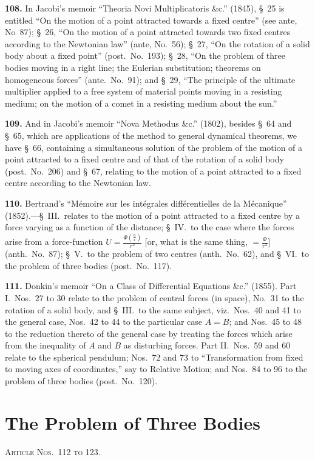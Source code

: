 \documentclass[11pt,a4paper]{article}
\theoremstyle{definition}
\begin{document}
\textbf{108.} In Jacobi's memoir ``Theoria Novi Multiplicatoris \&c.'' (1845), \S~25 is entitled ``On the motion of a point attracted towards a fixed centre'' (see ante, No~87); \S~26, ``On the motion of a point attracted towards two fixed centres according to the Newtonian law'' (ante, No.~56); \S~27, ``On the rotation of a solid body about a fixed point'' (post.\ No.~193); \S~28, ``On the problem of three bodies moving in a right line; the Eulerian substitution; theorems on homogeneous forces'' (ante.\ No.~91); and \S~29, ``The principle of the ultimate multiplier applied to a free system of material points moving in a resisting medium; on the motion of a comet in a resisting medium about the sun.''

\textbf{109.} And in Jacobi's memoir ``Nova Methodus \&c.'' (1802), besides \S~64 and \S~65, which are applications of the method to general dynamical theorems, we have \S~66, containing a simultaneous solution of the problem of the motion of a point attracted to a fixed centre and of that of the rotation of a solid body (post.\ No.~206) and \S~67, relating to the motion of a point attracted to a fixed centre according to the Newtonian law.

\textbf{110.} Bertrand's ``M\'emoire sur les int\'egrales diff\'erentielles de la M\'ecanique'' (1852).---\S~III.\ relates to the motion of a point attracted to a fixed centre by a force varying as a function of the distance; \S~IV.\ to the case where the forces arise from a force-function $U = \frac{\Phi(\frac{y}{x})}{r^2}$ [or, what is the same thing, $= \frac{\Phi}{r^2}$] (anth.\ No.~87); \S~V.\ to the problem of two centres (anth.\ No.~62), and \S~VI.\ to the problem of three bodies (post.\ No.~117).

\textbf{111.} Donkin's memoir ``On a Class of Differential Equations \&c.'' (1855). Part I.\ Nos.~27 to 30 relate to the problem of central forces (in space), No.~31 to the rotation of a solid body, and \S~III.\ to the same subject, viz.\ Nos.~40 and 41 to the general case, Nos.~42 to 44 to the particular case $A = B$; and Nos.~45 to 48 to the reduction thereto of the general case by treating the forces which arise from the inequality of $A$ and $B$ as disturbing forces. Part II.\ Nos.~59 and 60 relate to the spherical pendulum; Nos.~72 and 73 to ``Transformation from fixed to moving axes of coordinates,'' say to Relative Motion; and Nos.~84 to 96 to the problem of three bodies (post.\ No.~120).


\section*{The Problem of Three Bodies}
\noindent\textsc{Article Nos.~112 to 123.}
\end{document}
